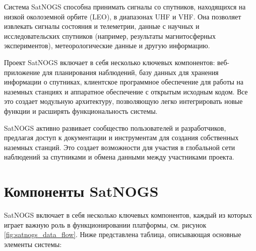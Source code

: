 \documentclass[14pt, a4paper]{bsu}
\begin{document}
Система SatNOGS способна принимать сигналы со спутников, находящихся на низкой
околоземной орбите (LEO), в диапазонах UHF и VHF. Она позволяет извлекать
сигналы состояния и телеметрии, данные с научных и исследовательских спутников
(например, результаты магнитосферных экспериментов), метеорологические данные и
другую информацию.

Проект SatNOGS включает в себя несколько ключевых компонентов: веб-приложение
для планирования наблюдений, базу данных для хранения информации о спутниках,
клиентское программное обеспечение для работы на наземных станциях и аппаратное
обеспечение с открытым исходным кодом. Все это создает модульную архитектуру,
позволяющую легко интегрировать новые функции и расширять функциональность
системы.

SatNOGS активно развивает сообщество пользователей и разработчиков, предлагая
доступ к документации и инструментам для создания собственных наземных станций.
Это создает возможности для участия в глобальной сети наблюдений за спутниками
и обмена данными между участниками проекта.

\section{Компоненты SatNOGS}

SatNOGS включает в себя несколько ключевых компонентов, каждый из которых
играет важную роль в функционировании платформы, см. рисунок
\ref{fig:satnogs_data_flow}. Ниже представлена таблица, описывающая основные
элементы системы:
\end{document}
